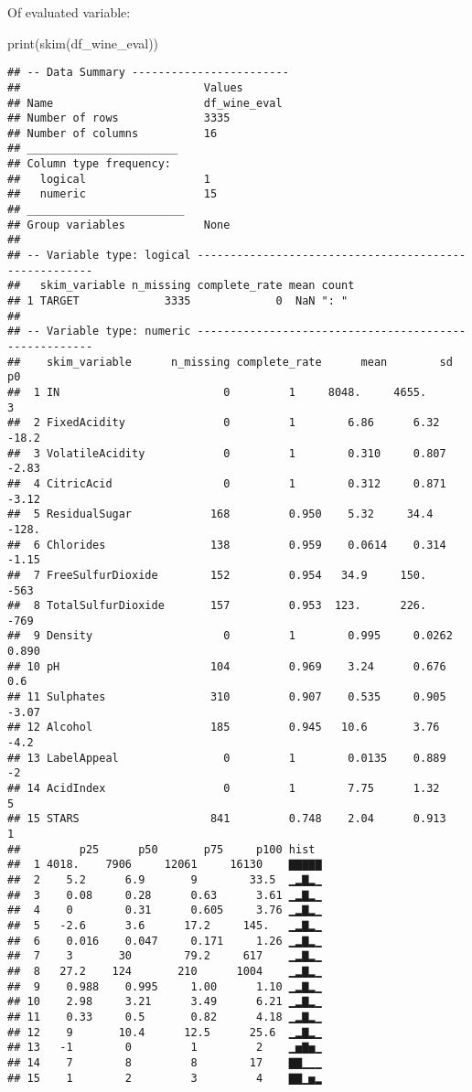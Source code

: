 \documentclass[
]{article}
\newenvironment{Shaded}{\begin{snugshade}}{\end{snugshade}}
\newcommand{\FunctionTok}[1]{\textcolor[rgb]{0.00,0.00,0.00}{#1}}
\newcommand{\NormalTok}[1]{#1}
\begin{document}
Of evaluated variable:

\begin{Shaded}
\begin{Highlighting}[]
\FunctionTok{print}\NormalTok{(}\FunctionTok{skim}\NormalTok{(df\_wine\_eval))}
\end{Highlighting}
\end{Shaded}

\begin{verbatim}
## -- Data Summary ------------------------
##                            Values      
## Name                       df_wine_eval
## Number of rows             3335        
## Number of columns          16          
## _______________________                
## Column type frequency:                 
##   logical                  1           
##   numeric                  15          
## ________________________               
## Group variables            None        
## 
## -- Variable type: logical ------------------------------------------------------
##   skim_variable n_missing complete_rate mean count
## 1 TARGET             3335             0  NaN ": " 
## 
## -- Variable type: numeric ------------------------------------------------------
##    skim_variable      n_missing complete_rate      mean        sd       p0
##  1 IN                         0         1     8048.     4655.        3    
##  2 FixedAcidity               0         1        6.86      6.32    -18.2  
##  3 VolatileAcidity            0         1        0.310     0.807    -2.83 
##  4 CitricAcid                 0         1        0.312     0.871    -3.12 
##  5 ResidualSugar            168         0.950    5.32     34.4    -128.   
##  6 Chlorides                138         0.959    0.0614    0.314    -1.15 
##  7 FreeSulfurDioxide        152         0.954   34.9     150.     -563    
##  8 TotalSulfurDioxide       157         0.953  123.      226.     -769    
##  9 Density                    0         1        0.995     0.0262    0.890
## 10 pH                       104         0.969    3.24      0.676     0.6  
## 11 Sulphates                310         0.907    0.535     0.905    -3.07 
## 12 Alcohol                  185         0.945   10.6       3.76     -4.2  
## 13 LabelAppeal                0         1        0.0135    0.889    -2    
## 14 AcidIndex                  0         1        7.75      1.32      5    
## 15 STARS                    841         0.748    2.04      0.913     1    
##         p25      p50       p75     p100 hist 
##  1 4018.    7906     12061     16130    ▇▇▇▇▇
##  2    5.2      6.9       9        33.5  ▁▂▇▂▁
##  3    0.08     0.28      0.63      3.61 ▁▂▇▂▁
##  4    0        0.31      0.605     3.76 ▁▂▇▂▁
##  5   -2.6      3.6      17.2     145.   ▁▂▇▂▁
##  6    0.016    0.047     0.171     1.26 ▁▂▇▂▁
##  7    3       30        79.2     617    ▁▂▇▂▁
##  8   27.2    124       210      1004    ▁▂▇▂▁
##  9    0.988    0.995     1.00      1.10 ▁▂▇▂▁
## 10    2.98     3.21      3.49      6.21 ▁▂▇▂▁
## 11    0.33     0.5       0.82      4.18 ▁▂▇▂▁
## 12    9       10.4      12.5      25.6  ▁▂▇▂▁
## 13   -1        0         1         2    ▁▅▇▅▁
## 14    7        8         8        17    ▇▇▁▁▁
## 15    1        2         3         4    ▇▇▁▅▂
\end{verbatim}
\end{document}
